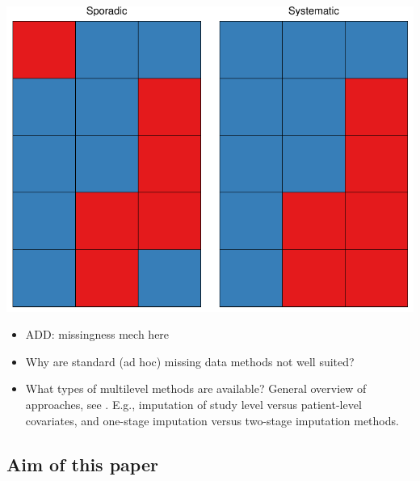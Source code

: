 \documentclass[
]{jss}
\begin{document}
\begin{CodeChunk}


\begin{center}\includegraphics{Multilevel-Missing-Data_files/figure-latex/patterns-1} \end{center}

\end{CodeChunk}

\begin{itemize}
\item
  ADD: missingness mech here
\item
  Why are standard (ad hoc) missing data methods not well suited?
\item
  What types of multilevel methods are available? General overview of
  approaches, see \citet{audi18} \citet{grun18}. E.g., imputation of
  study level versus patient-level covariates, and one-stage imputation
  versus two-stage imputation methods.
\end{itemize}

\hypertarget{aim-of-this-paper}{%
\subsection{Aim of this paper}\label{aim-of-this-paper}}
\end{document}
